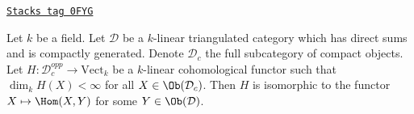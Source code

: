 \begin{lemma}
\label{equiv-lemma-van-den-bergh}
\href{https://stacks.math.columbia.edu/tag/0FYG}{\texttt{Stacks tag 0FYG}}

\begin{reference}
\cite[Lemma 2.14]{CKN}
\end{reference}
Let $k$ be a field. Let $\mathcal{D}$ be a $k$-linear triangulated category
which has direct sums and is compactly generated.
Denote $\mathcal{D}_c$ the full
subcategory of compact objects. Let $H : \mathcal{D}_c^{opp} \to \text{Vect}_k$
be a $k$-linear cohomological functor such that
$\dim_k H(X) < \infty$ for all $X \in \Ob(\mathcal{D}_c)$.
Then $H$ is isomorphic to the functor $X \mapsto \Hom(X, Y)$
for some $Y \in \Ob(\mathcal{D})$.
\end{lemma}

